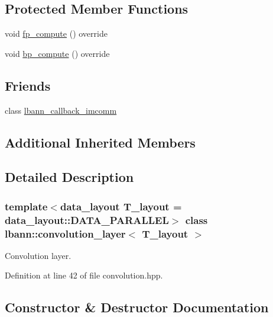 \subsection*{Protected Member Functions}
\begin{DoxyCompactItemize}
\item 
void \hyperlink{classlbann_1_1convolution__layer_aaca2c840fe41d8025efce91d6e9211b9}{fp\+\_\+compute} () override
\item 
void \hyperlink{classlbann_1_1convolution__layer_a610f24f98b548434cd4d22419f47c7f0}{bp\+\_\+compute} () override
\end{DoxyCompactItemize}
\subsection*{Friends}
\begin{DoxyCompactItemize}
\item 
class \hyperlink{classlbann_1_1convolution__layer_a6d54673503b45aeb6526f041224900c6}{lbann\+\_\+callback\+\_\+imcomm}
\end{DoxyCompactItemize}
\subsection*{Additional Inherited Members}


\subsection{Detailed Description}
\subsubsection*{template$<$data\+\_\+layout T\+\_\+layout = data\+\_\+layout\+::\+D\+A\+T\+A\+\_\+\+P\+A\+R\+A\+L\+L\+EL$>$\newline
class lbann\+::convolution\+\_\+layer$<$ T\+\_\+layout $>$}

Convolution layer. 

Definition at line 42 of file convolution.\+hpp.



\subsection{Constructor \& Destructor Documentation}
\mbox{\label{classlbann_1_1convolution__layer_aad28b1304d9440fc50b3b54438587aa3}} 
